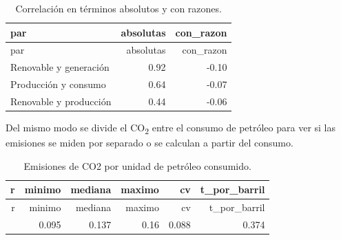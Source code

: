 \documentclass[oneside, openany, fontset=libertinus]{mitthesis}
\newenvironment{Shaded}{\begin{snugshade}}{\end{snugshade}}
\newcommand{\AttributeTok}[1]{\textcolor[rgb]{0.40,0.45,0.13}{#1}}
\newcommand{\DecValTok}[1]{\textcolor[rgb]{0.68,0.00,0.00}{#1}}
\newcommand{\FloatTok}[1]{\textcolor[rgb]{0.68,0.00,0.00}{#1}}
\newcommand{\FunctionTok}[1]{\textcolor[rgb]{0.28,0.35,0.67}{#1}}
\newcommand{\NormalTok}[1]{\textcolor[rgb]{0.00,0.23,0.31}{#1}}
\newcommand{\OtherTok}[1]{\textcolor[rgb]{0.00,0.23,0.31}{#1}}
\newcommand{\SpecialCharTok}[1]{\textcolor[rgb]{0.37,0.37,0.37}{#1}}
\newcommand{\StringTok}[1]{\textcolor[rgb]{0.13,0.47,0.30}{#1}}
\begin{document}
\Needspace{1.74in}

\begin{longtable}[]{@{}lrr@{}}
\caption{Correlación en términos absolutos y con
razones.}\tabularnewline
\toprule\noalign{}
par & absolutas & con\_razon \\
\midrule\noalign{}
\endfirsthead
\toprule\noalign{}
par & absolutas & con\_razon \\
\midrule\noalign{}
\endhead
\bottomrule\noalign{}
\endlastfoot
Renovable y generación & 0.92 & -0.10 \\
Producción y consumo & 0.64 & -0.07 \\
Renovable y producción & 0.44 & -0.06 \\
\end{longtable}

Del mismo modo se divide el CO\textsubscript{2} entre el consumo de
petróleo para ver si las emisiones se miden por separado o se calculan a
partir del consumo.

\Needspace{2.85in}

\begin{Shaded}
\end{Shaded}

\Needspace{1.36in}

\begin{longtable}[]{@{}rrrrrr@{}}
\caption{Emisiones de CO2 por unidad de petróleo
consumido.}\tabularnewline
\toprule\noalign{}
r & minimo & mediana & maximo & cv & t\_por\_barril \\
\midrule\noalign{}
\endfirsthead
\toprule\noalign{}
r & minimo & mediana & maximo & cv & t\_por\_barril \\
\midrule\noalign{}
\endhead
\bottomrule\noalign{}
\endlastfoot
0.999 & 0.095 & 0.137 & 0.16 & 0.088 & 0.374 \\
\end{longtable}
\end{document}
